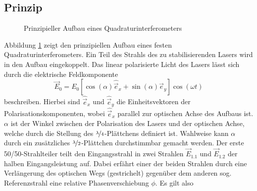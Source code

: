 \subsection{Prinzip}\label{subsec:quadraturinterferometer_prinzip}
\begin{figure}[h]
 	\centering
	\caption[Quadraturinterferometer - prinzipieller Aufbau]{Prinzipieller
	Aufbau eines
	Quadraturinterferometers}\label{fig:quadraturinterferometer_aufbau}
\end{figure}
Abbildung \ref{fig:quadraturinterferometer_aufbau} zeigt den prinzipiellen
Aufbau eines festen Quadraturinterferometers. Ein Teil des Strahls des zu stabilisierenden
Lasers wird in den Aufbau eingekoppelt. Das linear polarisierte
Licht des Lasers lässt sich durch die elektrische Feldkomponente
\begin{equation}\label{eq:quadraturinterfferometer_01}
	\vec{E}_0=E_0\left[\cos{(\alpha)}\hat{\vec{e}}_x+\sin{(\alpha)}\hat{\vec{e}}_y\right]\cos{(\omega
	t)}
\end{equation}
beschreiben. Hierbei sind $\hat{\vec{e}}_x$ und $\hat{\vec{e}}_y$ die
Einheitsvektoren der Polarisationskomponenten, wobei $\hat{\vec{e}}_x$ parallel
zur optischen Achse des Aufbaus ist. $\alpha$ ist der Winkel zwischen der
Polarisation des Lasers und der optischen Achse, welche durch die Stellung des
$\nicefrac{\lambda}{4}$-Plättchens definiert ist. Wahlweise kann $\alpha$ durch
ein zusätzliches $\nicefrac{\lambda}{2}$-Plättchen durchstimmbar gemacht werden.
Der erste 50/50-Strahlteiler teilt den Eingangsstrahl in zwei Strahlen
$\vec{E}_{1.1}$ und $\vec{E}_{1.2}$ der halben Eingangsleistung auf. Dabei erfährt einer der
beiden Strahlen durch eine Verlängerung des optischen Wegs (gestrichelt)
gegenüber dem anderen sog.
Referenzstrahl eine relative Phasenverschiebung $\phi$. Es gilt also
